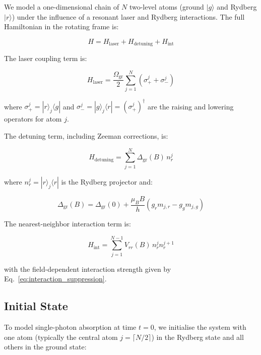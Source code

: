 We model a one-dimensional chain of $N$ two-level atoms (ground $|g\rangle$ and Rydberg $|r\rangle$) under the influence of a resonant laser and Rydberg interactions. The full Hamiltonian in the rotating frame is:

\begin{equation}
    H = H_{\mathrm{laser}} + H_{\mathrm{detuning}} + H_{\mathrm{int}}
    \label{eq:hamiltonian_full}
\end{equation}

The laser coupling term is:

\begin{equation}
    H_{\mathrm{laser}} = \frac{\Omega_{\mathrm{gr}}}{2} \sum_{j=1}^{N} \left( \sigma_+^j + \sigma_-^j \right)
    \label{eq:h_laser}
\end{equation}

where $\sigma_+^j = |r\rangle_j\langle g|$ and $\sigma_-^j = |g\rangle_j\langle r| = (\sigma_+^j)^\dagger$ are the raising and lowering operators for atom $j$.

The detuning term, including Zeeman corrections, is:

\begin{equation}
    H_{\mathrm{detuning}} = \sum_{j=1}^{N} \Delta_{\mathrm{gr}}(B) \, n_r^j
    \label{eq:h_detuning}
\end{equation}

where $n_r^j = |r\rangle_j\langle r|$ is the Rydberg projector and:

\begin{equation}
    \Delta_{\mathrm{gr}}(B) = \Delta_{\mathrm{gr}}(0) + \frac{\mu_B B}{h} \left( g_r m_{j,r} - g_g m_{j,g} \right)
    \label{eq:detuning_b}
\end{equation}

The nearest-neighbor interaction term is:

\begin{equation}
    H_{\mathrm{int}} = \sum_{j=1}^{N-1} V_{rr}(B) \, n_r^j n_r^{j+1}
    \label{eq:h_interaction}
\end{equation}

with the field-dependent interaction strength given by Eq.~\eqref{eq:interaction_suppression}.

\subsection*{Initial State}

To model single-photon absorption at time $t=0$, we initialise the system with one atom (typically the central atom $j = \lceil N/2 \rceil$) in the Rydberg state and all others in the ground state:


